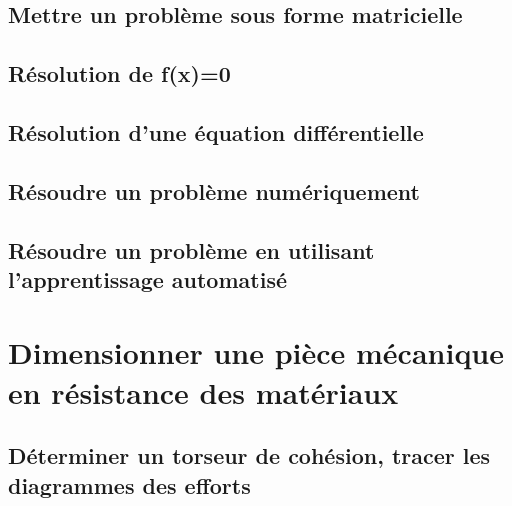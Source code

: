 \section{Mettre un problème sous forme matricielle} 
\section{Résolution de f(x)=0} 
\section{Résolution d'une équation différentielle} 
\section{Résoudre un problème numériquement} 
\section{Résoudre un problème en utilisant l'apprentissage automatisé} 
\setchapterpreamble[u]{\margintoc} 
\chapter{Dimensionner une pièce mécanique en résistance des matériaux} 
\section{Déterminer un torseur de cohésion, tracer les diagrammes des efforts} 
\graphicspath{{\repStyle/png/}{../RDM/RDM-01-Cohesion/522_RdM/images/}} 
 
 
\graphicspath{{\repStyle/png/}{../RDM/RDM-01-Cohesion/523_RdM/images/}} 
 
 
\graphicspath{{\repStyle/png/}{../RDM/RDM-01-Cohesion/524_RdM/images/}} 
 
 
\graphicspath{{\repStyle/png/}{../RDM/RDM-01-Cohesion/525_RdM/images/}} 
 
 
\graphicspath{{\repStyle/png/}{../RDM/RDM-01-Cohesion/526_RdM/images/}} 
 
 
\graphicspath{{\repStyle/png/}{../RDM/RDM-01-Cohesion/527_RdM/images/}} 
 
 
\graphicspath{{\repStyle/png/}{../RDM/RDM-01-Cohesion/528_BrocheFraisage/images/}} 
 
 
